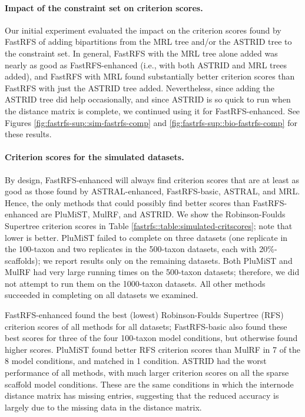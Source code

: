 \paragraph{Impact of the constraint set on criterion scores. }
Our initial experiment evaluated the impact on the
criterion scores found by FastRFS of
adding bipartitions from the MRL tree and/or the ASTRID tree to the constraint
set.
In general, FastRFS with the MRL tree alone added
was nearly as good as FastRFS-enhanced (i.e.,  with both 
ASTRID and MRL trees added), and FastRFS with MRL found substantially
better criterion scores than
FastRFS with just the ASTRID tree added.
Nevertheless, since adding
the ASTRID tree did help occasionally, and since ASTRID is so quick to
run when the distance matrix is complete, we continued using it for
FastRFS-enhanced.
See Figures \ref{fig:fastrfs-sup::sim-fastrfs-comp} and \ref{fig:fastrfs-sup::bio-fastrfs-comp} for these results.


\paragraph{Criterion scores for the simulated datasets. }

By design, FastRFS-enhanced will always find criterion scores
that are at least as good as those found
by ASTRAL-enhanced, FastRFS-basic, ASTRAL, and MRL.
Hence, the only methods that could possibly find
better scores than FastRFS-enhanced are PluMiST, MulRF,
and ASTRID. 
We show the Robinson-Foulds Supertree criterion scores
in Table \ref{fastrfs::table:simulated-critscores}; note that
lower is better.
PluMiST failed to complete
on three datasets (one replicate  in the 
100-taxon and two replicates in the 500-taxon
datasets, each with 20\%-scaffolds); we report
results only on the remaining datasets. 
Both PluMiST and MulRF had very large
running times on the 500-taxon datasets; therefore, 
we did not
attempt to run them on the 1000-taxon datasets.
All other methods succeeded in completing on all
datasets we examined.

FastRFS-enhanced found the 
best (lowest) Robinson-Foulds Supertree
(RFS)
criterion scores of all methods for
all datasets; FastRFS-basic also found
these best scores for three of the four 100-taxon
model conditions, but otherwise found higher scores.
PluMiST found better RFS 
criterion scores than MulRF in 7 of the 8
model conditions, and  matched in 1 condition.
ASTRID had the worst performance of all methods,
with much larger criterion scores on all
the sparse scaffold model conditions.
These are the same conditions in which 
the internode distance matrix has missing entries, 
suggesting that
the reduced accuracy is largely due to the missing data in
the distance matrix.

